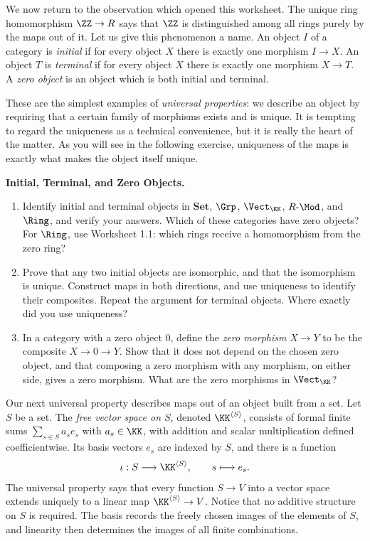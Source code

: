\documentclass[12pt,reqno]{amsart}
\begin{document}
\hrulefill

We now return to the observation which opened this worksheet. The unique ring homomorphism $\ZZ\to R$ says that $\ZZ$ is distinguished among all rings purely by the maps out of it. Let us give this phenomenon a name. An object $I$ of a category is \emph{initial} if for every object $X$ there is exactly one morphism $I\to X$. An object $T$ is \emph{terminal} if for every object $X$ there is exactly one morphism $X\to T$. A \emph{zero object} is an object which is both initial and terminal.

These are the simplest examples of \emph{universal properties}: we describe an object by requiring that a certain family of morphisms exists and is unique. It is tempting to regard the uniqueness as a technical convenience, but it is really the heart of the matter. As you will see in the following exercise, uniqueness of the maps is exactly what makes the object itself unique.

\hrulefill

\begin{problems}
\item\label{c:initial} \textbf{Initial, Terminal, and Zero Objects.}
\begin{enumerate}
\item Identify initial and terminal objects in $\mathbf{Set}$, $\Grp$, $\Vect_{\KK}$, $R\text{-}\Mod$, and $\Ring$, and verify your answers. Which of these categories have zero objects? For $\Ring$, use Worksheet 1.1: which rings receive a homomorphism from the zero ring?
\item Prove that any two initial objects are isomorphic, and that the isomorphism is unique. Construct maps in both directions, and use uniqueness to identify their composites. Repeat the argument for terminal objects. Where exactly did you use uniqueness?
\item In a category with a zero object $0$, define the \emph{zero morphism} $X\to Y$ to be the composite $X\to0\to Y$. Show that it does not depend on the chosen zero object, and that composing a zero morphism with any morphism, on either side, gives a zero morphism. What are the zero morphisms in $\Vect_{\KK}$?
\end{enumerate}
\end{problems}

\hrulefill

Our next universal property describes maps out of an object built from a set. Let $S$ be a set. The \emph{free vector space on $S$}, denoted $\KK^{\langle S\rangle}$, consists of formal finite sums $\sum_{s\in S}a_se_s$ with $a_s\in\KK$, with addition and scalar multiplication defined coefficientwise. Its basis vectors $e_s$ are indexed by $S$, and there is a function
\[
\iota:S\longrightarrow\KK^{\langle S\rangle},\qquad s\longmapsto e_s.
\]
The universal property says that every function $S\to V$ into a vector space extends uniquely to a linear map $\KK^{\langle S\rangle}\to V$. Notice that no additive structure on $S$ is required. The basis records the freely chosen images of the elements of $S$, and linearity then determines the images of all finite combinations.
\end{document}
